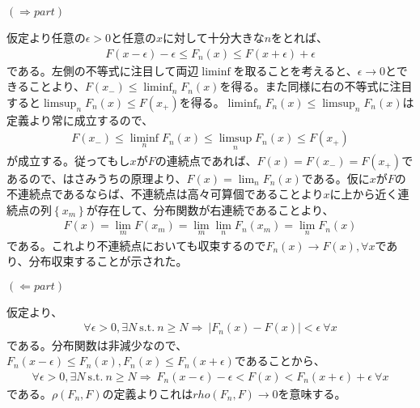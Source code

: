 \documentclass{article}
\begin{document}
\noindent $(\Rightarrow part)$

仮定より任意の$\epsilon > 0$と任意の$x$に対して十分大きな$n$をとれば、
\begin{align*}
	F(x-\epsilon) - \epsilon \leq F_n(x) \leq F(x+\epsilon) + \epsilon
\end{align*}
である。左側の不等式に注目して両辺$\liminf$を取ることを考えると、$\epsilon \to 0$とできることより、$F(x_{-}) \leq \liminf_n F_n(x)$を得る。また同様に右の不等式に注目すると$\limsup_n F_n(x) \leq F(x_{+})$を得る。$\liminf_n F_n(x) \leq \limsup_n F_n(x)$は定義より常に成立するので、
\begin{align*}
	F(x_{-}) \leq \liminf_n F_n(x) \leq \limsup_n F_n(x) \leq F(x_{+})
\end{align*}
が成立する。従ってもし$x$が$F$の連続点であれば、$F(x) = F(x_{-}) = F(x_{+})$であるので、はさみうちの原理より、$F(x) = \lim_n F_n(x)$である。仮に$x$が$F$の不連続点であるならば、不連続点は高々可算個であることより$x$に上から近く連続点の列$\left\{ x_m \right\}$が存在して、分布関数が右連続であることより、
\begin{align*}
	F(x) = \lim_m F(x_m) = \lim_m \lim_n F_n(x_m) = \lim_n F_n(x)
\end{align*}
である。これより不連続点においても収束するので$F_n(x) \to F(x), \forall x$であり、分布収束することが示された。

\noindent $(\Leftarrow part)$

仮定より、
\begin{align*}
	\forall \epsilon > 0, \exists N\ \text{s.t.}\ n\geq N \Rightarrow\ \left| F_n(x) - F(x) \right| < \epsilon\ \forall x
\end{align*}
である。分布関数は非減少なので、$F_n(x-\epsilon) \leq F_n(x), F_n(x) \leq F_n(x+\epsilon)$であることから、
\begin{align*}
	\forall \epsilon > 0, \exists N\ \text{s.t.}\ n\geq N \Rightarrow\ F_n(x-\epsilon) - \epsilon < F(x) < F_n(x+\epsilon) + \epsilon\ \forall x
\end{align*}
である。$\rho(F_n, F)$の定義よりこれは$rho(F_n, F) \to 0$を意味する。
\end{document}
